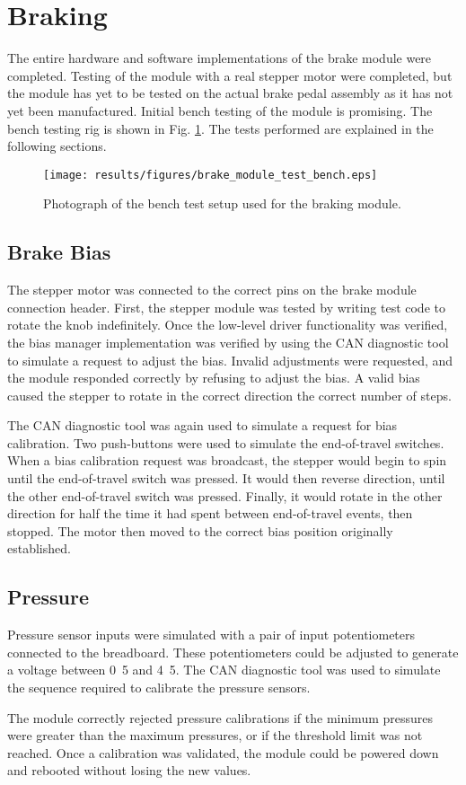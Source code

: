 \section{Braking}

The entire hardware and software implementations of the brake module were completed. Testing of the module with a real stepper motor were completed, but the module has yet to be tested on the actual brake pedal assembly as it has not yet been manufactured. Initial bench testing of the module is promising. The bench testing rig is shown in Fig. \ref{fig:brake_module_bench_test}. The tests performed are explained in the following sections.

\begin{figure}[H]
 \centering
 \texttt{[image: results/figures/brake\_module\_test\_bench.eps]}
 \caption{Photograph of the bench test setup used for the braking module.}
 \label{fig:brake_module_bench_test}
\end{figure}

\subsection{Brake Bias}

The stepper motor was connected to the correct pins on the brake module connection header. First, the stepper module was tested by writing test code to rotate the knob indefinitely. Once the low-level driver functionality was verified, the bias manager implementation was verified by using the CAN diagnostic tool to simulate a request to adjust the bias. Invalid adjustments were requested, and the module responded correctly by refusing to adjust the bias. A valid bias caused the stepper to rotate in the correct direction the correct number of steps.

The CAN diagnostic tool was again used to simulate a request for bias calibration. Two push-buttons were used to simulate the end-of-travel switches. When a bias calibration request was broadcast, the stepper would begin to spin until the end-of-travel switch was pressed. It would then reverse direction, until the other end-of-travel switch was pressed. Finally, it would rotate in the other direction for half the time it had spent between end-of-travel events, then stopped. The motor then moved to the correct bias position originally established.

\subsection{Pressure}

Pressure sensor inputs were simulated with a pair of input potentiometers connected to the breadboard. These potentiometers could be adjusted to generate a voltage between \unit{0.5}{\volt} and \unit{4.5}{\volt}. The CAN diagnostic tool was used to simulate the sequence required to calibrate the pressure sensors.

The module correctly rejected pressure calibrations if the minimum pressures were greater than the maximum pressures, or if the threshold limit was not reached. Once a calibration was validated, the module could be powered down and rebooted without losing the new values.

